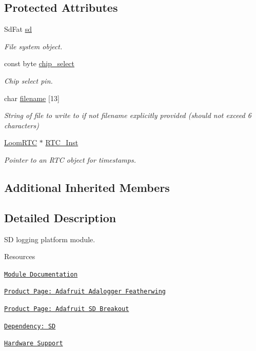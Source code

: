 \subsection*{Protected Attributes}
\begin{DoxyCompactItemize}
\item 
Sd\+Fat \hyperlink{class_loom___s_d_a0602d9ef1a9b7f8b31870702bcb692fd}{sd}
\begin{DoxyCompactList}\small\item\em File system object. \end{DoxyCompactList}\item 
const byte \hyperlink{class_loom___s_d_a404b47d978c23b9426dcfe1fe3a185e1}{chip\+\_\+select}
\begin{DoxyCompactList}\small\item\em Chip select pin. \end{DoxyCompactList}\item 
char \hyperlink{class_loom___s_d_a970a01045c1d73b67f23982842249097}{filename} \mbox{[}13\mbox{]}
\begin{DoxyCompactList}\small\item\em String of file to write to if not filename explicitly provided (should not exceed 6 characters) \end{DoxyCompactList}\item 
\hyperlink{class_loom_r_t_c}{Loom\+R\+TC} $\ast$ \hyperlink{class_loom___s_d_a3dcce942e87eabc4e3912d1af283618c}{R\+T\+C\+\_\+\+Inst}
\begin{DoxyCompactList}\small\item\em Pointer to an R\+TC object for timestamps. \end{DoxyCompactList}\end{DoxyCompactItemize}
\subsection*{Additional Inherited Members}


\subsection{Detailed Description}
SD logging platform module. 

\begin{DoxyParagraph}{Resources}

\begin{DoxyItemize}
\item \href{https://openslab-osu.github.io/Loom/html/class_loom___s_d.html}{\tt Module Documentation}
\item \href{https://www.adafruit.com/product/2922}{\tt Product Page\+: Adafruit Adalogger Featherwing}
\item \href{https://www.adafruit.com/product/254}{\tt Product Page\+: Adafruit SD Breakout}
\item \href{https://github.com/arduino-libraries/SD}{\tt Dependency\+: SD}
\item \href{https://github.com/OPEnSLab-OSU/Loom/wiki/Hardware-Support#sd-card}{\tt Hardware Support} 
\end{DoxyItemize}
\end{DoxyParagraph}


